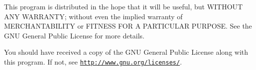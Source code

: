 This program is distributed in the hope that it will be useful, but W\+I\+T\+H\+O\+UT A\+NY W\+A\+R\+R\+A\+N\+TY; without even the implied warranty of M\+E\+R\+C\+H\+A\+N\+T\+A\+B\+I\+L\+I\+TY or F\+I\+T\+N\+E\+SS F\+OR A P\+A\+R\+T\+I\+C\+U\+L\+AR P\+U\+R\+P\+O\+SE. See the G\+NU General Public License for more details.

You should have received a copy of the G\+NU General Public License along with this program. If not, see \href{http://www.gnu.org/licenses/}{\tt http\+://www.\+gnu.\+org/licenses/}. 